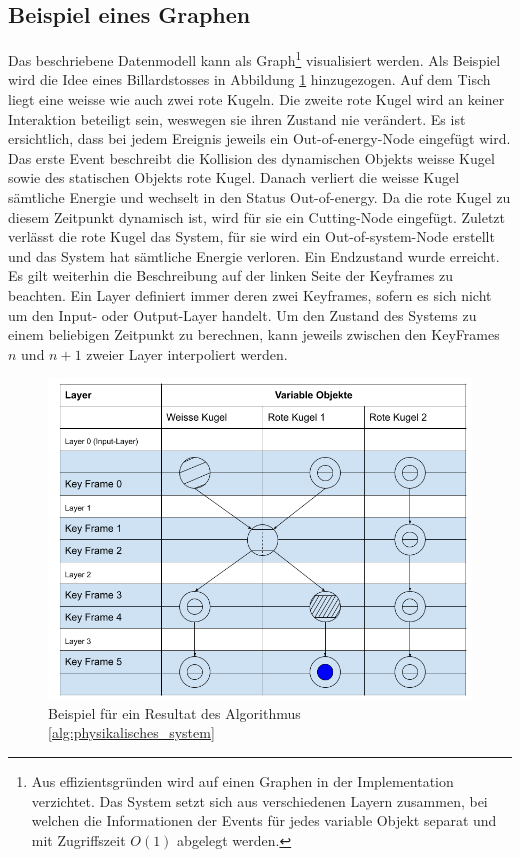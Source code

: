 \subsection{Beispiel eines Graphen}
Das beschriebene Datenmodell kann als Graph\footnote{Aus effizientsgründen wird auf einen Graphen in der Implementation
verzichtet. Das System setzt sich aus verschiedenen Layern zusammen, bei welchen die Informationen der Events für jedes
variable Objekt separat und mit Zugriffszeit $O(1)$ abgelegt werden.} visualisiert werden. Als Beispiel wird die Idee
eines Billardstosses in Abbildung \ref{fig:Beispiel für ein Resultat des Algorithmus phys_sys} hinzugezogen.
Auf dem Tisch liegt eine weisse wie auch zwei rote Kugeln. Die zweite rote Kugel wird an keiner Interaktion beteiligt sein,
weswegen sie ihren Zustand nie verändert. Es ist ersichtlich, dass bei jedem Ereignis jeweils ein \glqq Out-of-energy-Node\grqq{}
eingefügt wird. Das erste Event beschreibt die Kollision des dynamischen Objekts \glqq weisse Kugel\grqq{} sowie des
statischen Objekts \glqq rote Kugel\grqq{}. Danach verliert die weisse Kugel sämtliche Energie und wechselt in den
Status \glqq Out-of-energy\grqq{}. Da die rote Kugel zu diesem Zeitpunkt dynamisch ist, wird für sie ein
\glqq Cutting-Node\grqq{} eingefügt. Zuletzt verlässt die rote Kugel das System, für sie wird ein \glqq Out-of-system-Node\grqq{}
erstellt und das System hat sämtliche Energie verloren. Ein Endzustand wurde erreicht. Es gilt weiterhin die Beschreibung
auf der linken Seite der Keyframes zu beachten. Ein Layer definiert immer deren zwei Keyframes, sofern es sich nicht um
den Input- oder Output-Layer handelt. Um den Zustand des Systems zu einem beliebigen Zeitpunkt zu berechnen, kann
jeweils zwischen den KeyFrames $n$ und $n + 1$ zweier Layer interpoliert werden.
\begin{figure}[h!]
    \begin{center}
        \includegraphics[width=0.6\linewidth]{../common/03_billiard_ai/resources/10_datenmodell_beispiel.png}
    \end{center}
    \caption{Beispiel für ein Resultat des Algorithmus \ref{alg:physikalisches_system}}
    \label{fig:Beispiel für ein Resultat des Algorithmus phys_sys}
\end{figure}


